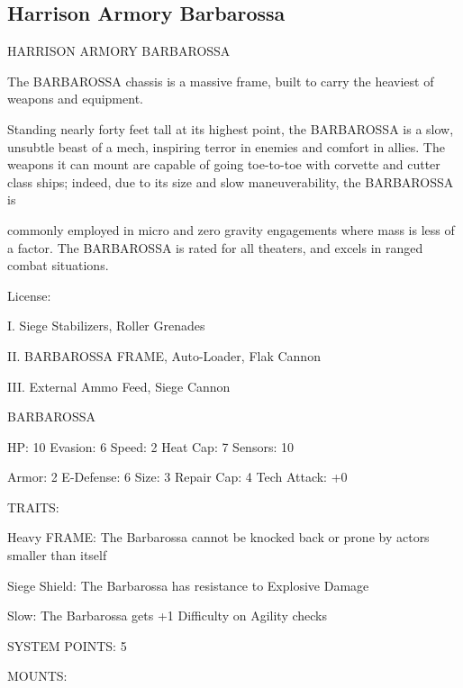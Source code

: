 \subsection{Harrison Armory Barbarossa}

                           HARRISON ARMORY BARBAROSSA  

The BARBAROSSA chassis is a massive frame, built to carry the heaviest of weapons and equipment.  

Standing nearly forty feet tall at its highest point, the BARBAROSSA is a slow, unsubtle beast of a mech,  
inspiring terror in enemies and comfort in allies. The weapons it can mount are capable of going toe-to-toe  
with corvette and cutter class ships; indeed, due to its size and slow maneuverability, the BARBAROSSA is  

                                                                                                          


commonly employed in micro and zero gravity engagements where mass is less of a factor. The  
BARBAROSSA is rated for all theaters, and excels in ranged combat situations.   

                                                  License:
 
I. Siege Stabilizers, Roller Grenades
 
II. BARBAROSSA FRAME, Auto-Loader, Flak Cannon
 
III. External Ammo Feed, Siege Cannon
 

                                            BARBAROSSA 

 HP: 10         Evasion: 6                           Speed: 2           Heat Cap: 7       Sensors: 10 

 Armor:  2      E-Defense: 6                         Size: 3            Repair Cap: 4     Tech Attack:  
                                                                                          +0 

                                                  TRAITS: 

 Heavy FRAME: The Barbarossa cannot be knocked back or prone by actors smaller than itself
 
 Siege Shield: The Barbarossa has resistance to Explosive Damage
 
 Slow: The Barbarossa gets +1 Difficulty on Agility checks 

                                           SYSTEM POINTS: 5 

                                                 MOUNTS: 

